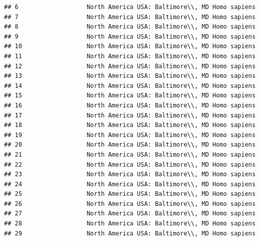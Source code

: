 \documentclass[
]{article}
\begin{document}
\begin{verbatim}
## 6                   North America USA: Baltimore\\, MD Homo sapiens
## 7                   North America USA: Baltimore\\, MD Homo sapiens
## 8                   North America USA: Baltimore\\, MD Homo sapiens
## 9                   North America USA: Baltimore\\, MD Homo sapiens
## 10                  North America USA: Baltimore\\, MD Homo sapiens
## 11                  North America USA: Baltimore\\, MD Homo sapiens
## 12                  North America USA: Baltimore\\, MD Homo sapiens
## 13                  North America USA: Baltimore\\, MD Homo sapiens
## 14                  North America USA: Baltimore\\, MD Homo sapiens
## 15                  North America USA: Baltimore\\, MD Homo sapiens
## 16                  North America USA: Baltimore\\, MD Homo sapiens
## 17                  North America USA: Baltimore\\, MD Homo sapiens
## 18                  North America USA: Baltimore\\, MD Homo sapiens
## 19                  North America USA: Baltimore\\, MD Homo sapiens
## 20                  North America USA: Baltimore\\, MD Homo sapiens
## 21                  North America USA: Baltimore\\, MD Homo sapiens
## 22                  North America USA: Baltimore\\, MD Homo sapiens
## 23                  North America USA: Baltimore\\, MD Homo sapiens
## 24                  North America USA: Baltimore\\, MD Homo sapiens
## 25                  North America USA: Baltimore\\, MD Homo sapiens
## 26                  North America USA: Baltimore\\, MD Homo sapiens
## 27                  North America USA: Baltimore\\, MD Homo sapiens
## 28                  North America USA: Baltimore\\, MD Homo sapiens
## 29                  North America USA: Baltimore\\, MD Homo sapiens

\end{verbatim}
\end{document}
